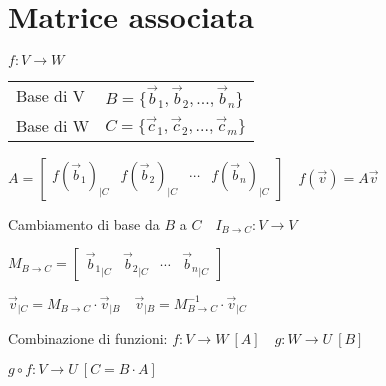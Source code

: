 \section{Matrice associata}
$f: V \rightarrow W$

\begin{tabular}{ll}
	Base di V & $B = \{\vec{b}_1, \vec{b}_2, ..., \vec{b}_n\}$ \\
	Base di W & $C = \{\vec{c}_1, \vec{c}_2, ..., \vec{c}_m\}$ \\
\end{tabular}

$A = \begin{bmatrix} f(\vec{b}_1)_{|C} & f(\vec{b}_2)_{|C} & \cdots & f(\vec{b}_n)_{|C} \end{bmatrix} \quad f(\vec{v}) = A\vec{v}$

\vspace{0.5em}

Cambiamento di base da $B$ a $C \quad I_{B\rightarrow C}: V \rightarrow V$

$M_{B\rightarrow C} = \begin{bmatrix} {\vec{b}_1}_{|C} & {\vec{b}_2}_{|C} & \cdots & {\vec{b}_n}_{|C} \end{bmatrix}$

$\vec{v}_{|C} = M_{B\rightarrow C} \cdot \vec{v}_{|B} \quad \vec{v}_{|B} = M_{B\rightarrow C}^{-1} \cdot \vec{v}_{|C}$

\vspace{0.5em}

Combinazione di funzioni: $f: V \rightarrow W\ [A] \quad g: W \rightarrow U\ [B]$

$g \circ f: V \rightarrow U\ [C = B \cdot A]$
